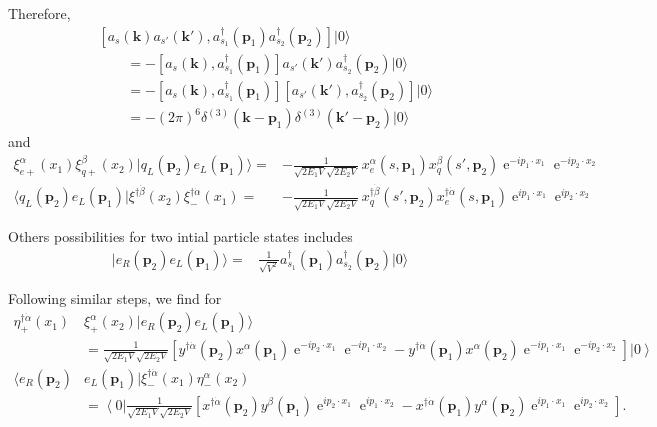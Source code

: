 Therefore,
\begin{align}
&\left[ a_s(\mathbf{k})a_{s'}(\mathbf{k}'),a_{s_1}^\dagger(\mathbf{p}_1)a_{s_2}^\dagger(\mathbf{p}_2)\right] |0\rangle \nonumber\\
&\qquad=
-
 \left[ a_s(\mathbf{k}),a_{s_1}^\dagger(\mathbf{p}_1)\right]a_{s'}(\mathbf{k}')a_{s_2}^\dagger(\mathbf{p}_2) |0\rangle \nonumber\\
&\qquad=-
  \left[ a_s(\mathbf{k}),a_{s_1}^\dagger(\mathbf{p}_1)\right] \left[ a_{s'}(\mathbf{k}'),a_{s_2}^\dagger(\mathbf{p}_2)  \right] |0\rangle \nonumber\\
&\qquad= -(2\pi)^6  
    \delta^{(3)}(\mathbf{k}-\mathbf{p}_1)\delta^{(3)}(\mathbf{k}'-\mathbf{p}_2)|0\rangle
\end{align}
and
\begin{align}
\label{eq:bkqlel}
    \xi^\alpha_{e+}(x_1)\xi^{\beta}_{q+}(x_2)|q_L(\mathbf{p}_2)e_L(\mathbf{p}_1)\rangle=&
-\frac{1}{\sqrt{2E_1 V}\sqrt{2E_2 V}}\,x^\alpha_e(s,\mathbf{p}_1)x^{\beta}_q(s',\mathbf{p}_2)\operatorname{e}^{-i p_1\cdot x_1}\operatorname{e}^{-i p_2\cdot x_2} \nonumber\\
   \langle q_L(\mathbf{p}_2) e_L(\mathbf{p}_1) |\xi^{\dagger\dot{\beta}}(x_2)\xi^{\dagger\dot{\alpha}}_-\left( x_1 \right)=&
-\frac{1}{\sqrt{2E_1 V}\sqrt{2E_2 V}}\,x^{\dagger\dot{\beta}}_q(s',\mathbf{p}_2) x^{\dagger\dot{\alpha}}_e(s,\mathbf{p}_1)\operatorname{e}^{i p_1\cdot x_1}\operatorname{e}^{i p_2\cdot x_2}
\end{align}





Others possibilities for two intial particle states includes
\begin{align}
  |e_R(\mathbf{p}_2)e_L(\mathbf{p}_1)\rangle=&\frac{1}{\sqrt{V^2}}a_{s_1}^\dagger(\mathbf{p}_1)a_{s_2}^\dagger(\mathbf{p}_2)|0\rangle
\end{align}

Following similar steps, we find for
\begin{align}
\eta^{\dagger\dot{\alpha}}_+(x_1)&\xi^{\alpha}_+(x_2)|e_R(\mathbf{p}_2)e_L(\mathbf{p}_1)\rangle
 \nonumber\\
\label{eq:berer}
&=\frac{1 }{\sqrt{2 E_1V}\sqrt{2 E_2V}} \left[ y^{\dagger\dot{\alpha}}(\mathbf{p}_2)x^{\alpha}(\mathbf{p}_1)
\operatorname{e}^{-i p_2\cdot x_1}\operatorname{e}^{-i p_1\cdot x_2}
-y^{\dagger\dot{\alpha}}(\mathbf{p}_1)x^{\alpha}(\mathbf{p}_2)
\operatorname{e}^{-i p_1\cdot x_1}\operatorname{e}^{-i p_2\cdot x_2}   \right] \left|0\right\rangle \\
\langle e_R(\mathbf{p}_2)&e_L(\mathbf{p}_1)| \xi^{\dagger\dot{\alpha}}_-(x_1)\eta^{\alpha}_-(x_2)
 \nonumber\\
\label{eq:berer}
&=\left\langle 0\right|\frac{1 }{\sqrt{2 E_1V}\sqrt{2 E_2V}} \left[ x^{\dagger\dot{\alpha}}(\mathbf{p}_2)y^{\beta}(\mathbf{p}_1)
\operatorname{e}^{i p_2\cdot x_1}\operatorname{e}^{i p_1\cdot x_2}
- x^{\dagger\dot{\alpha}}(\mathbf{p}_1)y^{\alpha}(\mathbf{p}_2)
\operatorname{e}^{i p_1\cdot x_1}\operatorname{e}^{i p_2\cdot x_2}   \right].
\end{align}


